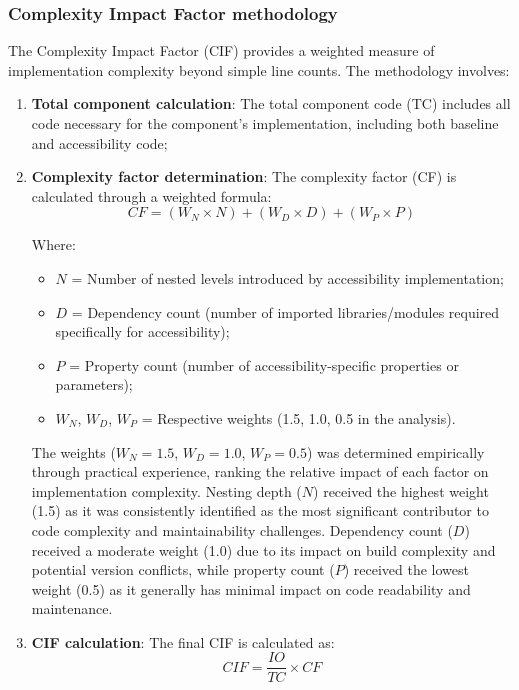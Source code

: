 \subsubsection{Complexity Impact Factor methodology}
\label{subsubsec:cif-methodology}

The Complexity Impact Factor (CIF) provides a weighted measure of implementation complexity beyond simple line counts. The methodology involves:

\begin{enumerate}
    \item \textbf{Total component calculation}: The total component code (TC) includes all code necessary for the component's implementation, including both baseline and accessibility code;
    
    \item \textbf{Complexity factor determination}: The complexity factor (CF) is calculated through a weighted formula:
    \begin{equation}
    CF = (W_N \times N) + (W_D \times D) + (W_P \times P)
    \end{equation}
    
    Where:
    \begin{itemize}
        \item $N$ = Number of nested levels introduced by accessibility implementation;
        \item $D$ = Dependency count (number of imported libraries/modules required specifically for accessibility);
        \item $P$ = Property count (number of accessibility-specific properties or parameters);
        \item $W_N$, $W_D$, $W_P$ = Respective weights (1.5, 1.0, 0.5 in the analysis).
    \end{itemize}

    The weights ($W_N=1.5$, $W_D=1.0$, $W_P=0.5$) was determined empirically through practical experience, ranking the relative impact of each factor on implementation complexity. Nesting depth ($N$) received the highest weight (1.5) as it was consistently identified as the most significant contributor to code complexity and maintainability challenges. Dependency count ($D$) received a moderate weight (1.0) due to its impact on build complexity and potential version conflicts, while property count ($P$) received the lowest weight (0.5) as it generally has minimal impact on code readability and maintenance.
    
    \item \textbf{CIF calculation}: The final CIF is calculated as:
    \begin{equation}
    CIF = \frac{IO}{TC} \times CF
    \end{equation}
    

\end{enumerate}
